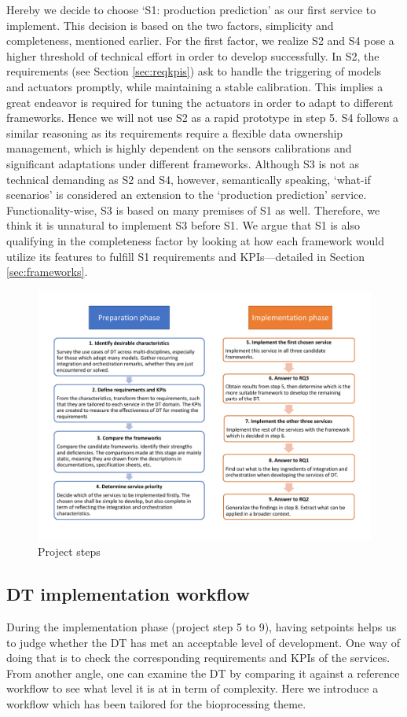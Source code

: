 \documentclass[journal,onecolumn]{IEEEtran} %
\begin{document}
Hereby we decide to choose `S1: production prediction' as our first service to implement. This decision is based on the two factors, simplicity and completeness, mentioned earlier. For the first factor, we realize S2 and S4 pose a higher threshold of technical effort in order to develop successfully. In S2, the requirements (see Section \ref{sec:reqkpis}) ask to handle the triggering of models and actuators promptly, while maintaining a stable calibration. This implies a great endeavor is required for tuning the actuators in order to adapt to different frameworks. Hence we will not use S2 as a rapid prototype in step 5. S4 follows a similar reasoning as its requirements require a flexible data ownership management, which is highly dependent on the sensors calibrations and significant adaptations under different frameworks. Although S3 is not as technical demanding as S2 and S4, however, semantically speaking, `what-if scenarios' is considered an extension to the `production prediction' service. Functionality-wise, S3 is based on many premises of S1 as well. Therefore, we think it is unnatural to implement S3 before S1. We argue that S1 is also qualifying in the completeness factor by looking at how each framework would utilize its features to fulfill S1 requirements and KPIs---detailed in Section \ref{sec:frameworks}.

 \begin{figure}[hbt!]
  \centering
  \includegraphics[scale=0.6]{figures/researchsteps.pdf}
  \caption{Project steps}
  \label{fig:researchsteps}
\end{figure}

\subsection{DT implementation workflow}\label{sec:5step}
During the implementation phase (project step 5 to 9), having setpoints helps us to judge whether the DT has met an acceptable level of development. One way of doing that is to check the corresponding requirements and KPIs of the services. From another angle, one can examine the DT by comparing it against a reference workflow to see what level it is at in term of complexity. Here we introduce a workflow which has been tailored for the bioprocessing theme.
\end{document}
